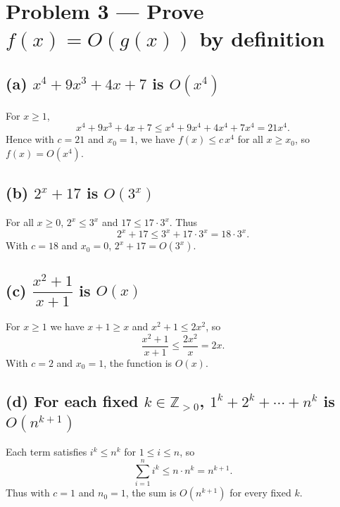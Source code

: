 \section*{Problem 3 — Prove $f(x)=O(g(x))$ by definition}

\subsection*{(a) $x^4+9x^3+4x+7$ is $O(x^4)$}
For $x\ge 1$,
\[
x^4+9x^3+4x+7 \le x^4+9x^4+4x^4+7x^4 = 21x^4.
\]
Hence with $c=21$ and $x_0=1$, we have $f(x)\le c\,x^4$ for all $x\ge x_0$, so $f(x)=O(x^4)$.

\subsection*{(b) $2^x+17$ is $O(3^x)$}
For all $x\ge 0$, $2^x\le 3^x$ and $17\le 17\cdot 3^x$. Thus
\[
2^x+17 \le 3^x + 17\cdot 3^x = 18\cdot 3^x.
\]
With $c=18$ and $x_0=0$, $2^x+17=O(3^x)$.

\subsection*{(c) $\dfrac{x^2+1}{x+1}$ is $O(x)$}
For $x\ge 1$ we have $x+1\ge x$ and $x^2+1\le 2x^2$, so
\[
\frac{x^2+1}{x+1} \le \frac{2x^2}{x}=2x.
\]
With $c=2$ and $x_0=1$, the function is $O(x)$.

\subsection*{(d) For each fixed $k\in\mathbb{Z}_{>0}$, $1^k+2^k+\cdots+n^k$ is $O(n^{k+1})$}
Each term satisfies $i^k\le n^k$ for $1\le i\le n$, so
\[
\sum_{i=1}^n i^k \le n\cdot n^k = n^{k+1}.
\]
Thus with $c=1$ and $n_0=1$, the sum is $O(n^{k+1})$ for every fixed $k$.
